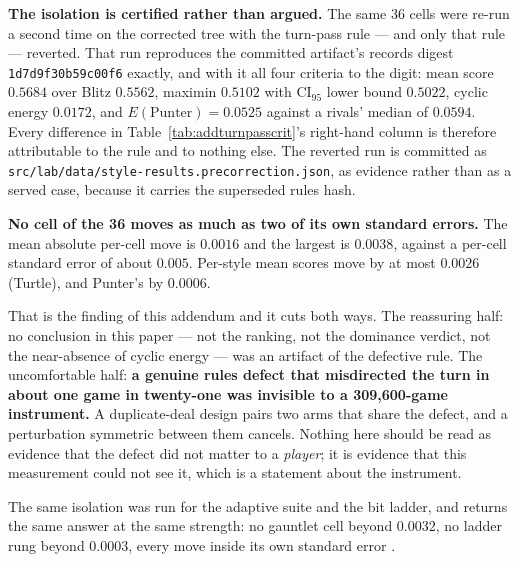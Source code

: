 \documentclass[11pt]{article}
\newcommand{\code}[1]{\texttt{#1}}
\begin{document}
\textbf{The isolation is certified rather than argued.} The same 36 cells were re-run a second
time on the corrected tree with the turn-pass rule --- and only that rule --- reverted. That run
reproduces the committed artifact's records digest \code{1d7d9f30b59c00f6} exactly, and with it
all four criteria to the digit: mean score $0.5684$ over Blitz $0.5562$, maximin $0.5102$ with
CI$_{95}$ lower bound $0.5022$, cyclic energy $0.0172$, and $E(\text{Punter}) = 0.0525$ against a
rivals' median of $0.0594$. Every difference in Table~\ref{tab:addturnpasscrit}'s right-hand column
is therefore attributable to the rule and to nothing else. The reverted run is committed as
\code{src/lab/data/style-results.precorrection.json}, as evidence rather than as a served case,
because it carries the superseded rules hash.

\textbf{No cell of the 36 moves as much as two of its own standard errors.} The mean absolute
per-cell move is $0.0016$ and the largest is $0.0038$, against a per-cell standard error of about
$0.005$. Per-style mean scores move by at most $0.0026$ (Turtle), and Punter's by $0.0006$.

That is the finding of this addendum and it cuts both ways. The reassuring half: no conclusion in
this paper --- not the ranking, not the dominance verdict, not the near-absence of cyclic energy
--- was an artifact of the defective rule. The uncomfortable half: \textbf{a genuine rules defect
that misdirected the turn in about one game in twenty-one was invisible to a 309{,}600-game
instrument.} A duplicate-deal design pairs two arms that share the defect, and a perturbation
symmetric between them cancels. Nothing here should be read as evidence that the defect did not
matter to a \emph{player}; it is evidence that this measurement could not see it, which is a
statement about the instrument.

The same isolation was run for the adaptive suite and the bit ladder, and returns the same answer
at the same strength: no gauntlet cell beyond $0.0032$, no ladder rung beyond $0.0003$, every move
inside its own standard error \cite{adaptivepaper}.
\end{document}
